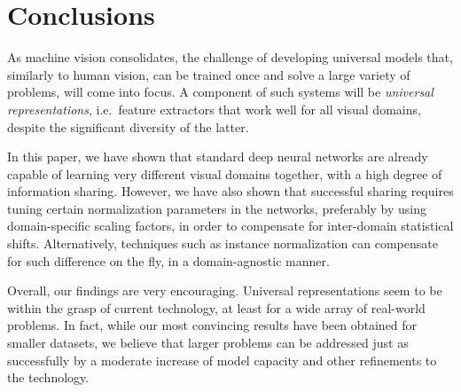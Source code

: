 \documentclass[10pt,twocolumn,letterpaper]{article}
\begin{document}
\section{Conclusions}\label{s:conclusions}


As machine vision consolidates, the challenge of developing universal models that, similarly to human vision, can be trained once and solve a large variety of problems, will come into focus. A component of such systems will be \emph{universal representations}, i.e.\ feature extractors that work well for all visual domains, despite the significant diversity of the latter.

In this paper, we have shown that standard deep neural networks are already capable of learning very different visual domains together, with a high degree of information sharing. However, we have also shown that successful sharing requires tuning certain normalization parameters in the networks, preferably by using domain-specific scaling factors, in order to compensate for inter-domain statistical shifts. Alternatively, techniques such as instance normalization can compensate for such difference on the fly, in a domain-agnostic manner.

Overall, our findings are very encouraging. Universal representations seem to be within the grasp of current technology, at least for a wide array of real-world problems. In fact, while our most convincing results have been obtained for smaller datasets, we believe that larger problems can be addressed just as successfully by a moderate increase of model capacity and other refinements to the technology.

\small


\end{document}
